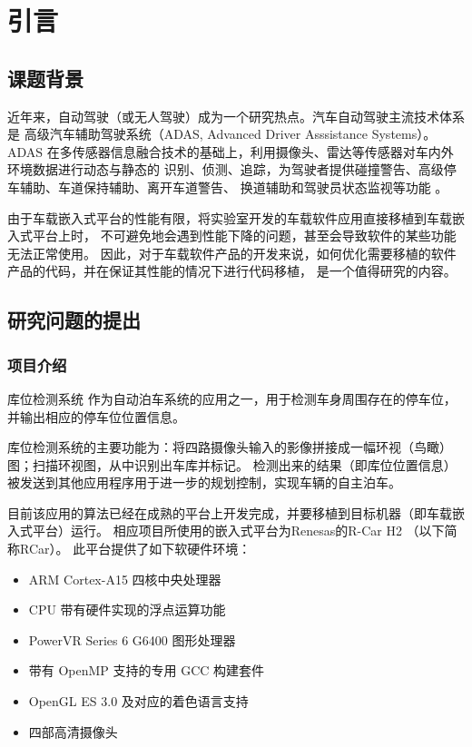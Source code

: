 
\section{引言}

\subsection{课题背景}
近年来，自动驾驶（或无人驾驶）成为一个研究热点。汽车自动驾驶主流技术体系是
高级汽车辅助驾驶系统（ADAS, Advanced Driver Asssistance Systems）。
ADAS 在多传感器信息融合技术的基础上，利用摄像头、雷达等传感器对车内外环境数据进行动态与静态的
识别、侦测、追踪，为驾驶者提供碰撞警告、高级停车辅助、车道保持辅助、离开车道警告、
换道辅助和驾驶员状态监视等功能 \cite{adas}。

由于车载嵌入式平台的性能有限，将实验室开发的车载软件应用直接移植到车载嵌入式平台上时，
不可避免地会遇到性能下降的问题，甚至会导致软件的某些功能无法正常使用。
因此，对于车载软件产品的开发来说，如何优化需要移植的软件产品的代码，并在保证其性能的情况下进行代码移植，
是一个值得研究的内容。

\subsection{研究问题的提出}
\subsubsection{项目介绍}
库位检测系统 \cite{huang2017} 作为自动泊车系统的应用之一，用于检测车身周围存在的停车位，并输出相应的停车位位置信息。

库位检测系统的主要功能为：将四路摄像头输入的影像拼接成一幅环视（鸟瞰）图；扫描环视图，从中识别出车库并标记。
检测出来的结果（即库位位置信息）被发送到其他应用程序用于进一步的规划控制，实现车辆的自主泊车。

目前该应用的算法已经在成熟的平台上开发完成，并要移植到目标机器（即车载嵌入式平台）运行。
相应项目所使用的嵌入式平台为Renesas的R-Car H2 \cite{rcarh2, rcarh2wiki} （以下简称RCar）。
此平台提供了如下软硬件环境：

{
\begin{itemize}
    \addtolength{\itemindent}{2.5em}
    \item ARM Cortex-A15 四核中央处理器 \cite{arma15}
    \item CPU 带有硬件实现的浮点运算功能 \cite{armhf}
    \item PowerVR Series 6 G6400 图形处理器 \cite{pvrs6gpu}
    \item 带有 OpenMP 支持的专用 GCC 构建套件 \cite{openmp}
    \item OpenGL ES 3.0 及对应的着色语言支持 \cite{opengles3}
    \item 四部高清摄像头
\end{itemize}
}

